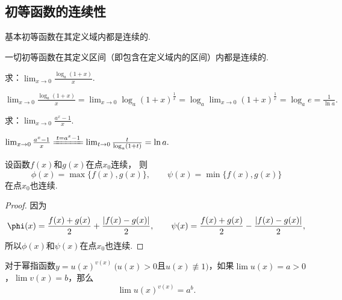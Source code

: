 \subsection{初等函数的连续性}
\begin{theorem}\label{theorem:极限.连续函数的极限5}
基本初等函数在其定义域内都是连续的.
\end{theorem}

\begin{corollary}\label{theorem:极限.连续函数的极限6}
一切初等函数在其定义区间（即包含在定义域内的区间）内都是连续的.
\end{corollary}

\begin{example}
求：\(\lim_{x\to0}\frac{\log_a (1+x)}{x}\).
\begin{solution}
\(
\lim_{x\to0}\frac{\log_a (1+x)}{x}
= \lim_{x\to0}\log_a (1+x)^{\frac{1}{x}}
= \log_a \lim_{x\to0}(1+x)^{\frac{1}{x}}
= \log_a e
= \frac{1}{\ln a}.
\)
\end{solution}
\end{example}

\begin{example}
求：\(\lim_{x\to0}\frac{a^x - 1}{x}\).
\begin{solution}
\(
\lim_{x\to0}\frac{a^x - 1}{x}
\xlongequal{t=a^x-1} \lim_{t\to0}\frac{t}{\log_a (1+t)}
= \ln a.
\)
\end{solution}
\end{example}

\begin{proposition}
设函数\(f(x)\)和\(g(x)\)在点\(x_0\)连续，
则\[
	\phi(x)=\max\{f(x),g(x)\}, \qquad
	\psi(x)=\min\{f(x),g(x)\}
\]在点\(x_0\)也连续.
\begin{proof}
因为\[
	\phi(x)=\frac{f(x)+g(x)}{2}+\frac{\abs{f(x)-g(x)}}{2}, \qquad
	\psi(x)=\frac{f(x)+g(x)}{2}-\frac{\abs{f(x)-g(x)}}{2},
\]
所以\(\phi(x)\)和\(\psi(x)\)在点\(x_0\)也连续.
\end{proof}
\end{proposition}

\begin{theorem}\label{theorem:极限.连续函数的极限7}
对于幂指函数\(y = u(x)^{v(x)}\ (u(x) > 0\)且\(u(x) \not\equiv 1)\)，如果\(\lim u(x) = a > 0\)，\(\lim v(x) = b\)，那么\[
\lim u(x)^{v(x)} = a^b.
\]
\end{theorem}

